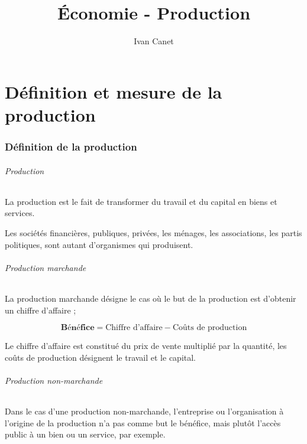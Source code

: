 \documentclass[10pt,a4paper,french]{article}
\begin{document}
\title{Économie - Production}
\author{Ivan Canet}
\maketitle


\tableofcontents

\part{Définition et mesure de la production}

\section{Définition de la production}

\paragraph{Production}

La production est le fait de transformer du travail et du capital en biens et services.

Les sociétés financières, publiques, privées, les ménages, les associations, les partis politiques, sont autant
d’organismes qui produisent.

\paragraph{Production marchande}

La production marchande désigne le cas où le but de la production est d’obtenir un chiffre d’affaire ;

\[
\textbf{Bénéfice} = \text{Chiffre d'affaire} - \text{Coûts de production}
\]

Le chiffre d’affaire est constitué du prix de vente multiplié par la quantité, les coûts de production
désignent le travail et le capital.

\paragraph{Production non-marchande}

Dans le cas d’une production non-marchande, l’entreprise ou l’organisation à l’origine de la production n’a
pas comme but le bénéfice, mais plutôt l’accès public à un bien ou un service, par exemple.
\end{document}
